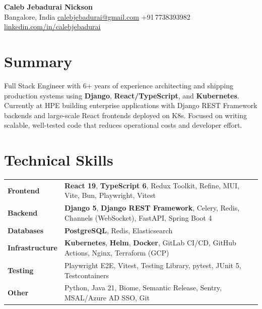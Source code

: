 \documentclass[a4paper,11pt]{article}
\begin{document}
\begin{center}
  {\LARGE\bfseries Caleb Jebadurai Nickson} \\[0.3em]
  {\color{muted} Bangalore, India \quad
  \href{mailto:calebjebadurai@gmail.com}{calebjebadurai@gmail.com} \quad
  +91\,7738393982 \quad
  \href{https://linkedin.com/in/calebjebadurai}{linkedin.com/in/calebjebadurai}}
\end{center}

\section{Summary}
Full Stack Engineer with 6+ years of experience architecting and shipping production systems using
\textbf{Django}, \textbf{React/TypeScript}, and \textbf{Kubernetes}.
Currently at HPE building enterprise applications with Django REST Framework backends and
large-scale React frontends deployed on K8s. Focused on writing scalable, well-tested code
that reduces operational costs and developer effort.

\section{Technical Skills}
\begin{tabularx}{\textwidth}{@{}l X@{}}
  \textbf{Frontend}       & \textbf{React 19}, \textbf{TypeScript 6}, Redux Toolkit, Refine, MUI, Vite, Bun, Playwright, Vitest \\
  \textbf{Backend}        & \textbf{Django 5}, \textbf{Django REST Framework}, Celery, Redis, Channels (WebSocket), FastAPI, Spring Boot 4 \\
  \textbf{Databases}      & \textbf{PostgreSQL}, Redis, Elasticsearch \\
  \textbf{Infrastructure} & \textbf{Kubernetes}, \textbf{Helm}, \textbf{Docker}, GitLab CI/CD, GitHub Actions, Nginx, Terraform (GCP) \\
  \textbf{Testing}        & Playwright E2E, Vitest, Testing Library, pytest, JUnit 5, Testcontainers \\
  \textbf{Other}          & Python, Java 21, Biome, Semantic Release, Sentry, MSAL/Azure AD SSO, Git \\
\end{tabularx}

\end{document}
